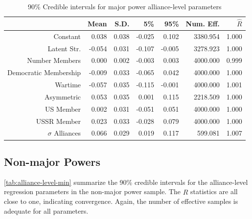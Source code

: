 \documentclass[12pt]{article}
\begin{document}
\begin{table}[ht]
\centering
\begin{tabular}{rrrrrrr}
  \hline
 & Mean & S.D. & 5\% & 95\% & Num. Eff. & $\hat{R}$ \\ 
  \hline
Constant & 0.038 & 0.038 & -0.025 & 0.102 & 3380.954 & 1.000 \\ 
  Latent Str. & -0.054 & 0.031 & -0.107 & -0.005 & 3278.923 & 1.000 \\ 
  Number Members & 0.000 & 0.002 & -0.003 & 0.003 & 4000.000 & 0.999 \\ 
  Democratic Membership & -0.009 & 0.033 & -0.065 & 0.042 & 4000.000 & 1.000 \\ 
  Wartime & -0.057 & 0.035 & -0.115 & -0.001 & 4000.000 & 1.001 \\ 
  Asymmetric & 0.053 & 0.035 & 0.001 & 0.115 & 2218.509 & 1.000 \\ 
  US Member & 0.002 & 0.031 & -0.051 & 0.051 & 4000.000 & 1.000 \\ 
  USSR Member & 0.023 & 0.033 & -0.028 & 0.079 & 4000.000 & 1.000 \\ 
  $\sigma$ Alliances & 0.066 & 0.029 & 0.019 & 0.117 & 599.081 & 1.007 \\ 
   \hline
\end{tabular}
\caption{90\% Credible intervals for major power alliance-level parameters}
\label{tab:alliance-level-maj}
\end{table}



\subsection{Non-major Powers} 

\autoref{tab:alliance-level-min} summarize the 90\% credible intervals for the alliance-level regression parameters in the non-major power sample. 
The $\hat{R}$ statistics are all close to one, indicating convergence. 
Again, the number of effective samples is adequate for all parameters.
\end{document}
